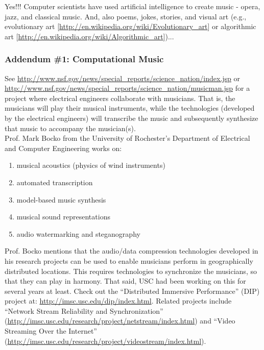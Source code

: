 Yes!!! Computer scientists have used artificial intelligence to create music - opera, jazz, and classical music. And, also poems, jokes, stories, and visual art (e.g., evolutionary art [\url{http://en.wikipedia.org/wiki/Evolutionary_art}] or algorithmic art [\url{http://en.wikipedia.org/wiki/Algorithmic_art}])... \\


\subsubsection{\hspace{0.1in} Addendum \#1: Computational Music}
\label{compmusicaddendum1}

See \url{http://www.nsf.gov/news/special_reports/science_nation/index.jsp} or \url{http://www.nsf.gov/news/special_reports/science_nation/musicman.jsp} for a project where electrical engineers collaborate with musicians. That is, the musicians will play their musical instruments, while the technologies (developed by the electrical engineers) will transcribe the music and subsequently synthesize that music to accompany the musician(s). \\

 
Prof. Mark Bocko from the University of Rochester's Department of Electrical and Computer Engineering works on: \vspace{-0.3cm}
\begin{enumerate} \itemsep -4pt
\item musical acoustics (physics of wind instruments)
\item automated transcription
\item model-based music synthesis
\item musical sound representations
\item audio watermarking and steganography
\end{enumerate}

Prof. Bocko mentions that the audio/data compression technologies developed in his research projects can be used to enable musicians perform in geographically distributed locations. This requires technologies to synchronize the musicians, so that they can play in harmony. That said, USC had been working on this for several years at least. Check out the ``Distributed Immersive Performance'' (DIP) project at: \url{http://imsc.usc.edu/dip/index.html}. Related projects include ``Network Stream Reliability and Synchronization'' (\url{http://imsc.usc.edu/research/project/netstream/index.html}) and ``Video Streaming Over the Internet'' (\url{http://imsc.usc.edu/research/project/videostream/index.html}). \\
 
